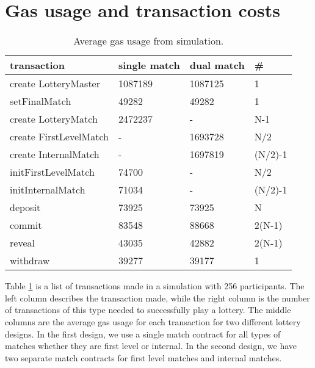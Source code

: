 \section{Gas usage and transaction costs}
\label{sec:gas}

\begin{table}[h]
\centering
\caption{Average gas usage from simulation.}
\label{tab:gas-usage}
\begin{tabular}{|l|l|l|l|}
\hline

transaction & single match & dual match & \# \\ \hline
create LotteryMaster & 1087189 & 1087125 & 1 \\ \hline
setFinalMatch & 49282 & 49282 & 1 \\ \hline
create LotteryMatch & 2472237 & - & N-1 \\ \hline
create FirstLevelMatch & - & 1693728 & N/2 \\ \hline
create InternalMatch & - & 1697819 & (N/2)-1 \\ \hline
initFirstLevelMatch & 74700 & - & N/2 \\ \hline
initInternalMatch & 71034 & - & (N/2)-1 \\ \hline
deposit & 73925 & 73925 & N \\ \hline
commit & 83548 & 88668 & 2(N-1) \\ \hline
reveal & 43035 & 42882 & 2(N-1) \\ \hline
withdraw & 39277 & 39177 & 1 \\ \hline

\end{tabular}
\end{table}

\noindent
Table \ref{tab:gas-usage} is a list of transactions made in a simulation with 256 participants. The left column describes the transaction made, while the right column is the number of transactions of this type needed to successfully play a lottery. The middle columns are the average gas usage for each transaction for two different lottery designs. In the first design, we use a single match contract for all types of matches whether they are first level or internal. In the second design, we have two separate match contracts for first level matches and internal matches. 

